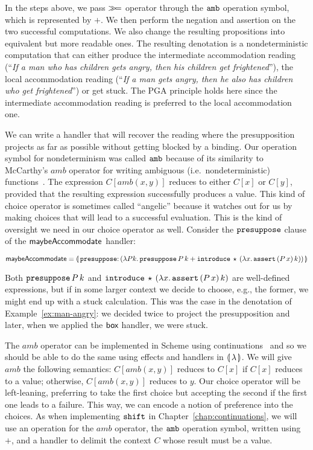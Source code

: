 In the steps above, we pass $\mathbin{\gg\!=}$ operator through the $\mathtt{amb}$
operation symbol, which is represented by $+$. We then perform the negation
and assertion on the two successful computations. We also change the
resulting propositions into equivalent but more readable ones. The
resulting denotation is a nondeterministic computation that can either
produce the intermediate accommodation reading (``\emph{If a man who has
  children gets angry, then his children get frightened}''), the local
accommodation reading (``\emph{If a man gets angry, then he also has
  children who get frightened}'') or get stuck. The PGA principle holds
here since the intermediate accommodation reading is preferred to the local
accommodation one.

We can write a handler that will recover the reading where the
presupposition projects as far as possible without getting blocked by a
binding. Our operation symbol for nondeterminism was called $\mathtt{amb}$
because of its similarity to McCarthy's $amb$ operator for writing
ambiguous (i.e.\ nondeterministic)
functions~\cite{mccarthy1961basis,abelson1996structure}. The expression
$C[amb(x,y)]$ reduces to either $C[x]$ or $C[y]$, provided that the
resulting expression successfully produces a value. This kind of choice
operator is sometimes called ``angelic'' because it watches out for us by
making choices that will lead to a successful evaluation. This is the kind
of oversight we need in our choice operator as well. Consider the
$\mathtt{presuppose}$ clause of the $\textsf{maybeAccommodate}$ handler:

$$
  \maybeAccommodate = \banana{\onto{\op{presuppose}}{(\lam{P k}{
    \app{\op{presuppose}}{P}{k} +
    \app{\op{introduce}}{\star}{(\lam{x}{\app{\op{assert}}{(\ap{P}{x})}{k}})}})}}
$$

Both $\mathtt{presuppose}\,P\,k$ and
$\mathtt{introduce}\,\star\,(\lambda x.\, \mathtt{assert}\,(P\,x)\,k)$
are well-defined expressions, but if in some larger context we decide to
choose, e.g., the former, we might end up with a stuck calculation. This
was the case in the denotation of Example~\ref{ex:man-angry}: we decided
twice to project the presupposition and later, when we applied the $\textsf{box}$
handler, we were stuck.

The $amb$ operator can be implemented in Scheme using
continuations~\cite{sitaram1998teach} and so we should be able to do the
same using effects and handlers in $\llparenthesis \, \lambda \, \rrparenthesis$. We will give $amb$
the following semantics: $C[amb(x, y)]$ reduces to $C[x]$ if $C[x]$ reduces
to a value; otherwise, $C[amb(x, y)]$ reduces to $y$. Our choice operator
will be left-leaning, preferring to take the first choice but accepting the
second if the first one leads to a failure. This way, we can encode a
notion of preference into the choices. As when implementing $\mathtt{shift}$ in
Chapter~\ref{chap:continuations}, we will use an operation for the $amb$
operator, the $\mathtt{amb}$ operation symbol, written using $+$, and a handler
to delimit the context $C$ whose result must be a value.

